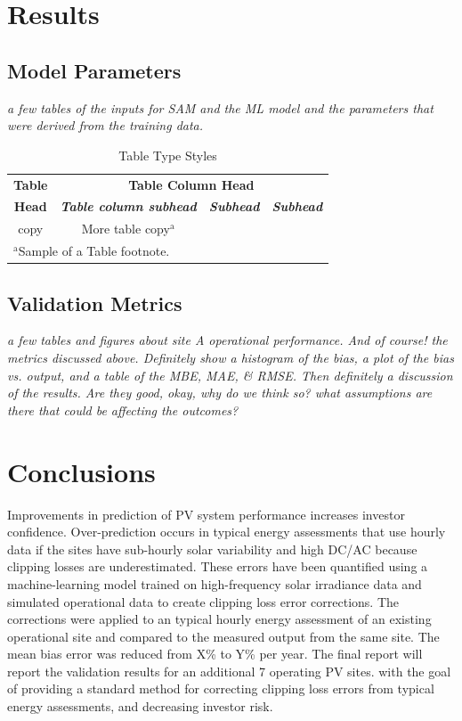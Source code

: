 \documentclass[conference]{IEEEtran}
\begin{document}
\section{Results}

\subsection{Model Parameters}

\textit{\color{red}a few tables of the inputs for SAM and the ML model and the parameters that were derived from the training data.}

\begin{table}[htbp]
\caption{Table Type Styles}
\begin{center}
\begin{tabular}{|c|c|c|c|}
\hline
\textbf{Table}&\multicolumn{3}{|c|}{\textbf{Table Column Head}} \\
\cline{2-4} 
\textbf{Head} & \textbf{\textit{Table column subhead}}& \textbf{\textit{Subhead}}& \textbf{\textit{Subhead}} \\
\hline
copy& More table copy$^{\mathrm{a}}$& &  \\
\hline
\multicolumn{4}{l}{$^{\mathrm{a}}$Sample of a Table footnote.}
\end{tabular}
\label{tab1}
\end{center}
\end{table}

\subsection{Validation Metrics}

\textit{\color{red}a few tables and figures about site A operational performance. And of course! the metrics discussed above. Definitely show a histogram of the bias, a plot of the bias vs. output, and a table of the MBE, MAE, \& RMSE. Then definitely a discussion of the results. Are they good, okay, why do we think so? what assumptions are there that could be affecting the outcomes?}

\section{Conclusions}
Improvements in prediction of PV system performance increases investor confidence. Over-prediction occurs in typical energy assessments that use hourly data if the sites have sub-hourly solar variability and high DC/AC because clipping losses are underestimated. These errors have been quantified using a machine-learning model trained on high-frequency solar irradiance data and simulated operational data to create clipping loss error corrections. The corrections were applied to an typical hourly energy assessment of an existing operational site and compared to the measured output from the same site. The mean bias error was reduced from X\% to Y\% per year. The final report will report the validation results for an additional 7 operating PV sites. with the goal of providing a standard method for correcting clipping loss errors from typical energy assessments, and decreasing investor risk.
\end{document}
